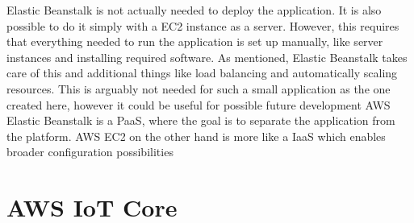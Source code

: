Elastic Beanstalk is not actually needed to deploy the application. It is also possible to do it simply with a EC2 instance as a server. However, this requires that everything needed to run the application is set up manually, like server instances and installing required software. As mentioned, Elastic Beanstalk takes care of this and additional things like load balancing and automatically scaling resources. This is arguably not needed for such a small application as the one created here, however it could be useful for possible future development %
AWS Elastic Beanstalk is a PaaS, where the goal is to separate the application from the platform. AWS EC2 on the other hand is more like a IaaS which enables broader configuration possibilities



\section{AWS IoT Core}








